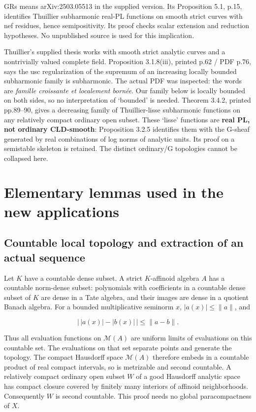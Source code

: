 \documentclass[
  11pt,
]{article}
\begin{document}
GRs means arXiv:2503.05513 in the supplied version. Its Proposition 5.1,
p.15, identifies Thuillier subharmonic real-PL functions on smooth
strict curves with nef residues, hence semipositivity. Its proof checks
scalar extension and reduction hypotheses. No unpublished source is used
for this implication.

Thuillier's supplied thesis works with smooth strict analytic curves and
a nontrivially valued complete field. Proposition 3.1.8(iii), printed
p.62 / PDF p.76, says the usc regularization of the supremum of an
increasing locally bounded subharmonic family is subharmonic. The actual
PDF was inspected: the words are \emph{famille croissante et localement
bornée}. Our family below is locally bounded on both sides, so no
interpretation of `bounded' is needed. Theorem 3.4.2, printed pp.89--90,
gives a decreasing family of Thuillier-lisse subharmonic functions on
any relatively compact ordinary open subset. These `lisse' functions are
\textbf{real PL, not ordinary CLD-smooth}: Proposition 3.2.5 identifies
them with the G-sheaf generated by real combinations of log norms of
analytic units. Its proof on a semistable skeleton is retained. The
distinct ordinary/G topologies cannot be collapsed here.

\section{Elementary lemmas used in the new
applications}\label{elementary-lemmas-used-in-the-new-applications}

\subsection{Countable local topology and extraction of an actual
sequence}\label{countable-local-topology-and-extraction-of-an-actual-sequence}

Let \(K\) have a countable dense subset. A strict \(K\)-affinoid algebra
\(A\) has a countable norm-dense subset: polynomials with coefficients
in a countable dense subset of \(K\) are dense in a Tate algebra, and
their images are dense in a quotient Banach algebra. For a bounded
multiplicative seminorm \(x\), \(|a(x)|\leq\|a\|\), and

\[
\big|\,|a(x)|-|b(x)|\,\big|\leq\|a-b\|.
\]

Thus all evaluation functions on \(\mathcal M(A)\) are uniform limits of
evaluations on this countable set. The evaluations on that set separate
points and generate the topology. The compact Hausdorff space
\(\mathcal M(A)\) therefore embeds in a countable product of real
compact intervals, so is metrizable and second countable. A relatively
compact ordinary open subset \(W\) of a good Hausdorff analytic space
has compact closure covered by finitely many interiors of affinoid
neighborhoods. Consequently \(W\) is second countable. This proof needs
no global paracompactness of \(X\).
\end{document}
